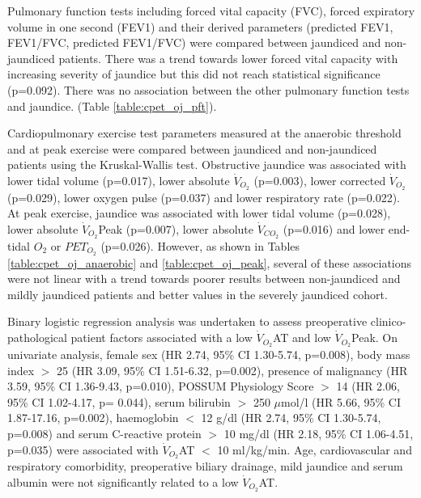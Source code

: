 


Pulmonary function tests including forced vital capacity (FVC), forced expiratory volume in one second (FEV1) and their derived parameters (predicted FEV1, FEV1/FVC, predicted FEV1/FVC) were compared between jaundiced and non-jaundiced patients. There was a trend towards lower forced vital capacity with increasing severity of jaundice but this did not reach statistical significance (p=0.092). There was no association between the other pulmonary function tests and jaundice. (Table \ref{table:cpet_oj_pft}).



Cardiopulmonary exercise test parameters measured at the anaerobic threshold and at peak exercise were compared between jaundiced and non-jaundiced patients using the Kruskal-Wallis test. Obstructive jaundice was associated with lower tidal volume (p=0.017), lower absolute $\dot{V}_{O_2}$ (p=0.003), lower corrected $\dot{V}_{O_2}$ (p=0.029), lower oxygen pulse (p=0.037) and lower respiratory rate (p=0.022). At peak exercise, jaundice was associated with lower tidal volume (p=0.028), lower absolute $\dot{V}_{O_2}$Peak (p=0.007), lower absolute $\dot{V}_{CO_2}$ (p=0.016) and lower end-tidal $O_2$ or $PET_{O_2}$ (p=0.026). However, as shown in Tables \ref{table:cpet_oj_anaerobic} and \ref{table:cpet_oj_peak}, several of these associations were not linear with a trend towards poorer results between non-jaundiced and mildly jaundiced patients and better values in the severely jaundiced cohort. 




Binary logistic regression analysis was undertaken to assess preoperative clinico-pathological patient factors associated with a low $\dot{V}_{O_2}$AT and low $\dot{V}_{O_2}$Peak. On univariate analysis, female sex (HR 2.74, 95\% CI 1.30-5.74, p=0.008), body mass index $>$ 25 (HR 3.09, 95\% CI 1.51-6.32, p=0.002), presence of malignancy (HR 3.59, 95\% CI 1.36-9.43, p=0.010), POSSUM Physiology Score $>$ 14 (HR 2.06, 95\% CI 1.02-4.17, p= 0.044), serum bilirubin $>$ 250 $\mu$mol/l (HR 5.66, 95\% CI 1.87-17.16, p=0.002), haemoglobin $<$ 12 g/dl (HR 2.74, 95\% CI 1.30-5.74, p=0.008) and serum C-reactive protein $>$ 10 mg/dl (HR 2.18, 95\% CI 1.06-4.51, p=0.035) were associated with $\dot{V}_{O_2}$AT $<$ 10 ml/kg/min. Age, cardiovascular and respiratory comorbidity, preoperative biliary drainage, mild jaundice and serum albumin were not significantly related to a low $\dot{V}_{O_2}$AT. 

